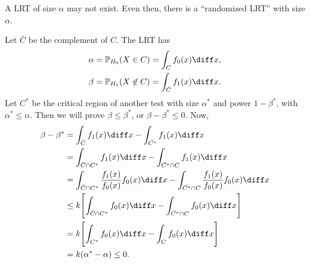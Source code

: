 \documentclass[12pt]{article}
\begin{document}
\begin{remark}
	A LRT of size $\alpha$ may not exist. Even then, there is a ``randomized LRT'' with size $\alpha$.
\end{remark}

\begin{proofbox}
	Let $\bar{C}$ be the complement of $C$. The LRT has
	\begin{align*}
		\alpha &= \mathbb{P}_{H_0}(X \in C) = \int_{C} f_0(x) \diff x, \\
		\beta &= \mathbb{P}_{H_1}(X \not \in C) = \int_{\bar{C}} f_1(x) \diff x.
	\end{align*}
	Let $C^{\ast}$ be the critical region of another test with size $\alpha^{\ast}$ and power $1 - \beta^{\ast}$, with $\alpha^{\ast} \leq \alpha$. Then we will prove $\beta \leq \beta^{\ast}$, or $\beta - \beta^{\ast} \leq 0$. Now,
	\begin{align*}
		\beta - \beta^{\ast} &= \int_{\bar C} f_1(x) \diff x - \int_{\bar{C^{\ast}}} f_1(x) \diff x \\
				     &= \int_{\bar C \cap C^{\ast}} f_1(x) \diff x - \int_{\bar{C^{\ast}} \cap C} f_1(x) \diff x \\
				     &= \int_{\bar C \cap C^{\ast}} \frac{f_1(x)}{f_0(x)} f_0(x) \diff x - \int_{\bar{C^{\ast}} \cap C} \frac{f_1(x)}{f_0(x)} f_0(x) \diff x \\
				     &\leq k \Biggl[ \int_{\bar C \cap C^{\ast}} f_0(x) \diff x - \int_{\bar{C^{\ast}} \cap C}f_0(x) \diff x \Biggr] \\
				     &= k \Biggl[ \int_{C^{\ast}} f_0(x) \diff x - \int_{C} f_0(x) \diff x \Biggr] \\
				     &= k(\alpha^{\ast} - \alpha) \leq 0.
	\end{align*}
\end{proofbox}
\end{document}
